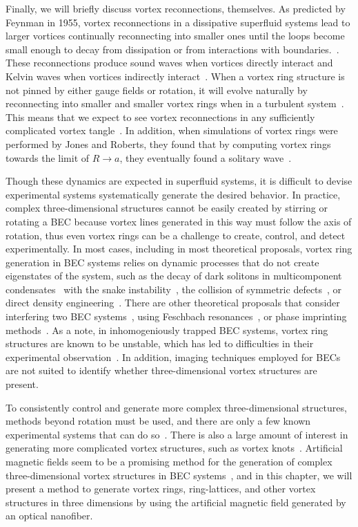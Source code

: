 Finally, we will briefly discuss vortex reconnections, themselves.
As predicted by Feynman in 1955, vortex reconnections in a dissipative superfluid systems lead to larger vortices continually reconnecting into smaller ones until the loops become small enough to decay from dissipation or from interactions with boundaries.~\cite{feynman1955}.
These reconnections produce sound waves when vortices directly interact and Kelvin waves when vortices indirectly interact~\cite{paoletti2011}.
When a vortex ring structure is not pinned by either gauge fields or rotation, it will evolve naturally by reconnecting into smaller and smaller vortex rings when in a turbulent system~\cite{jackson1999}. 
This means that we expect to see vortex reconnections in any sufficiently complicated vortex tangle~\cite{barenghi2014}.
In addition, when simulations of vortex rings were performed by Jones and Roberts, they found that by computing vortex rings towards the limit of $R \rightarrow a$, they eventually found a solitary wave~\cite{jones1982, berloff2005}.

Though these dynamics are expected in superfluid systems, it is difficult to devise experimental systems systematically generate the desired behavior.
In practice, complex three-dimensional structures cannot be easily created by stirring or rotating a BEC because vortex lines generated in this way must follow the axis of rotation, thus even vortex rings can be a challenge to create, control, and detect experimentally.
In most cases, including in most theoretical proposals, vortex ring generation in BEC systems relies on dynamic processes that do not create eigenstates of the system, such as the decay of dark solitons in multicomponent condensates~\cite{anderson2001} with the snake instability~\cite{ruostekoski2001}, the collision of symmetric defects~\cite{ginsberg2005}, or direct density engineering~\cite{shomroni2009, ruostekoski2005}.
There are other theoretical proposals that consider interfering two BEC systems~\cite{jackson1999}, using Feschbach resonances~\cite{pinsker2013}, or phase imprinting methods~\cite{ruostekoski2001}.
As a note, in inhomogeniously trapped BEC systems, vortex ring structures are known to be unstable, which has led to difficulties in their experimental observation~\cite{abad2008}.
In addition, imaging techniques employed for BECs are not suited to identify whether three-dimensional vortex structures are present.

To consistently control and generate more complex three-dimensional structures, methods beyond rotation must be used, and there are only a few known experimental systems that can do so~\cite{anderson2001,yefsah2013}.
There is also a large amount of interest in generating more complicated vortex structures, such as vortex knots~\cite{maucher2016, kleckner2016, ricca1999}.
Artificial magnetic fields seem to be a promising method for the generation of complex three-dimensional vortex structures in BEC systems~\cite{duncan2019}, and in this chapter, we will present a method to generate vortex rings, ring-lattices, and other vortex structures in three dimensions by using the artificial magnetic field generated by an optical nanofiber.

